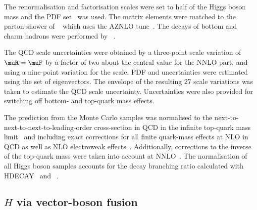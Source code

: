 The renormalisation and factorisation scales were set to half of the Higgs boson mass and the \PDFforLHC[15nnlo] PDF
set~\cite{Butterworth:2015oua} was used. The matrix elements were matched to the parton shower of \PYTHIA[8]~\cite{Sjostrand:2014zea}
which uses the AZNLO tune~\cite{STDM-2012-23}. The decays of bottom and charm hadrons
were performed by \EVTGEN~\cite{Lange:2001uf}.

The QCD scale uncertainties were obtained by a three-point scale variation of $\muR=\muF$ by a factor of two about 
the central value for the NNLO part, and using a nine-point variation for the \POWHEGBOX scale. 
PDF and \alphas uncertainties were estimated using the \PDFforLHC[15nlo] set of eigenvectors.
The envelope of the resulting 27 scale variations was taken to estimate the QCD scale uncertainty. 
Uncertainties were also provided for switching off bottom- and top-quark mass effects.

The prediction from the Monte Carlo samples was normalised to the next-to-next-to-next-to-leading-order 
cross-section in QCD in the infinite top-quark mass 
limit~\cite{deFlorian:2016spz,Anastasiou:2016cez,Anastasiou:2015ema,Dulat:2018rbf,Aglietti:2004nj} and including exact 
corrections for all finite quark-mass effects at NLO in QCD as well as NLO electroweak 
effects~\cite{Actis:2008ug,Bonetti:2018ukf}. Additionally, corrections to the inverse of the top-quark mass were taken 
into account at NNLO~\cite{Harlander:2009mq,Harlander:2009bw,Harlander:2009my,Pak:2009dg}. 
The normalisation of all Higgs boson samples accounts for the decay branching ratio calculated with 
HDECAY~\cite{Djouadi:1997yw,Spira:1997dg,Djouadi:2006bz}
and \PROPHECY~\cite{Bredenstein:2006ha,Bredenstein:2006rh,Bredenstein:2006nk}.


\subsection{$H$ via vector-boson fusion}

